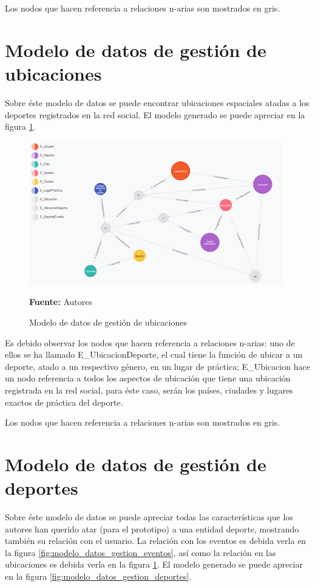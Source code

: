 Los nodos que hacen referencia a relaciones n-arias son mostrados en gris.

\section{Modelo de datos de gestión de ubicaciones}

Sobre éste modelo de datos se puede encontrar ubicaciones espaciales atadas a los deportes registrados en la red social. El modelo generado se puede apreciar en la figura \ref{fig:modelo_datos_gestion_ubicaciones}.

\begin{figure}[!htb]
  \begin{center}
    \includegraphics[width=11cm]{./imagenes/Modelo_de_datos/Gestion_ubicaciones.png}
    \caption{Modelo de datos de gestión de ubicaciones}
    \label{fig:modelo_datos_gestion_ubicaciones}
    \textbf{Fuente:}  Autores
  \end{center}
\end{figure}

Es debido observar los nodos que hacen referencia a relaciones n-arias: uno de ellos se ha llamado E\_UbicacionDeporte, el cual tiene la función de ubicar a un deporte, atado a un respectivo género, en un lugar de práctica; E\_Ubicacion hace un nodo referencia a todos los aspectos de ubicación que tiene una ubicación registrada en la red social, para éste caso, serán los países, ciudades y lugares exactos de práctica del deporte.

Los nodos que hacen referencia a relaciones n-arias son mostrados en gris.

\section{Modelo de datos de gestión de deportes}

Sobre éste modelo de datos se puede apreciar todas las características que los autores han querido atar (para el prototipo) a una entidad deporte, mostrando también su relación con el usuario. La relación con los eventos es debida verla en la figura \ref{fig:modelo_datos_gestion_eventos}, así como la relación en las ubicaciones es debida verla en la figura \ref{fig:modelo_datos_gestion_ubicaciones}. El modelo generado se puede apreciar en la figura \ref{fig:modelo_datos_gestion_deportes}.

